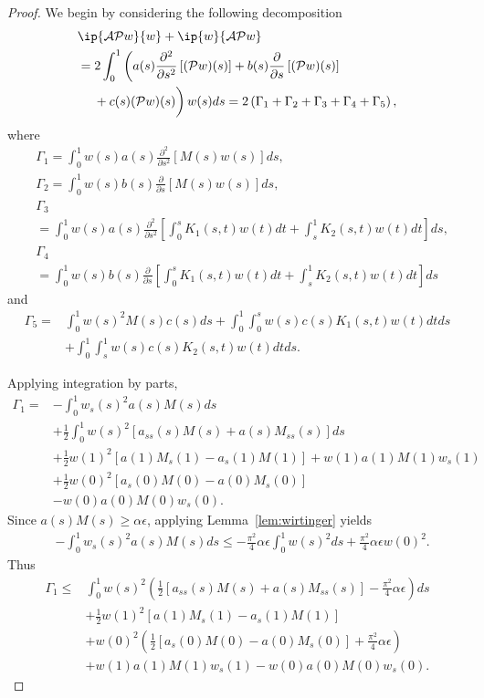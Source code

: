 \documentclass[9pt,journal,twocolumn]{IEEEtran}
\newcommand{\pfs}{\frac{\partial}{\partial s}}
\newcommand{\igzo}{\int_0^1}
\newcommand{\igzs}{\int_0^s}
\newcommand{\igso}{\int_s^1}
\begin{document}
\begin{proof}
We begin by considering the following decomposition
\begin{align}
&\ip{\mathcal{A}\mathcal{P}w}{w}+\ip{w}{\mathcal{A}\mathcal{P}w} \nonumber \\
&= 2 \igzo \left(a(s)\frac{\partial^2}{\partial s^2}\left[(\mathcal{P}w)(s) \right]+b(s)\pfs \left[(\mathcal{P}w)(s) \right] \right. \nonumber \\
&\quad \left. \vphantom{\pfs} + c(s)(\mathcal{P}w)(s)  \right)w(s) ds \label{eqn:dual_gamma}= 2 \left(\Gamma_1+\Gamma_2+\Gamma_3+\Gamma_4+\Gamma_5  \right),
\end{align} where
\begin{align*}
&\Gamma_1 = \igzo w(s)a(s) \frac{\partial^2}{\partial s^2} \left[M(s)w(s) \right]ds,\\
&\Gamma_2 = \igzo w(s)b(s) \pfs \left[M(s)w(s) \right]ds,\\
&\Gamma_3 \\
&= \igzo w(s)a(s)\frac{\partial^2}{\partial s^2} \left[\igzs K_1(s,t)w(t)dt + \igso K_2(s,t)w(t)dt \right]ds,\\
&\Gamma_4 \\
&=\igzo w(s)b(s) \pfs \left[\igzs K_1(s,t)w(t)dt + \igso K_2(s,t)w(t)dt \right]ds
\end{align*} and
\begin{align*}
\Gamma_5 = &\igzo w(s)^2 M(s)c(s)ds  + \igzo \igzs w(s)c(s)K_1(s,t)w(t)dtds \\
&+ \igzo \igso w(s)c(s)K_2(s,t)w(t)dtds.
\end{align*}

Applying integration by parts,
\begin{align*}
\Gamma_1 =& -\igzo w_s(s)^2 a(s)M(s)ds \\
&+ \frac{1}{2}\igzo w(s)^2 \left[a_{ss}(s)M(s)+a(s)M_{ss}(s) \right]ds \\
&+ \frac{1}{2}w(1)^2 \left[a(1)M_s(1)-a_s(1)M(1) \right]+w(1)a(1)M(1)w_s(1) \\
&+ \frac{1}{2}w(0)^2 \left[a_s(0)M(0)-a(0)M_s(0) \right] \\
&-w(0)a(0)M(0)w_s(0).
\end{align*} Since $a(s)M(s) \geq \alpha \epsilon$, applying Lemma~\ref{lem:wirtinger} yields
\begin{align*}
&-\igzo w_s(s)^2 a(s)M(s)ds \leq -\frac{\pi^2}{4}\alpha \epsilon \igzo w(s)^2 ds+\frac{\pi^2}{4}\alpha \epsilon w(0)^2. 
\end{align*} Thus
\begin{align}
\Gamma_1 \leq & \igzo w(s)^2 \left( \frac{1}{2}\left[a_{ss}(s)M(s)+a(s)M_{ss}(s) \right]-\frac{\pi^2}{4}\alpha \epsilon \right)ds  \nonumber \\
&+ \frac{1}{2}w(1)^2 \left[a(1)M_s(1)-a_s(1)M(1) \right] \nonumber \\
&+ w(0)^2 \left( \frac{1}{2}\left[a_s(0)M(0)-a(0)M_s(0) \right]+\frac{\pi^2}{4} \alpha \epsilon \right) \nonumber \\
&\label{eqn:dual_gamma_1}+w(1)a(1)M(1)w_s(1)-w(0)a(0)M(0)w_s(0).
\end{align}


\end{proof}
\end{document}
